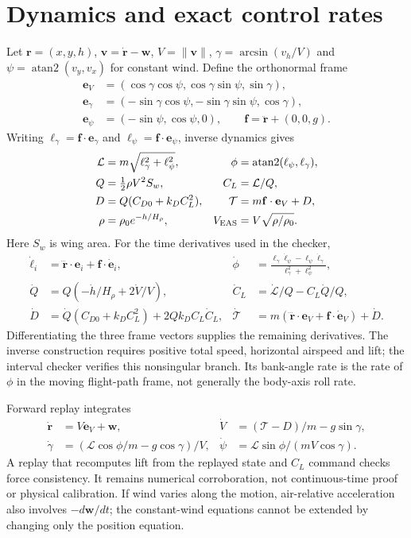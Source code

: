 \appendix
\section{Dynamics and exact control rates}\label{app:dynamics}
Let $\mathbf r=(x,y,h)$, $\mathbf v=\dot{\mathbf r}-\mathbf w$, $V=\|\mathbf v\|$, $\gamma=\arcsin(v_h/V)$ and $\psi=\operatorname{atan2}(v_y,v_x)$ for constant wind. Define the orthonormal frame
\begin{align}
\mathbf e_V&=(\cos\gamma\cos\psi,\cos\gamma\sin\psi,\sin\gamma),\\
\mathbf e_\gamma&=(-\sin\gamma\cos\psi,-\sin\gamma\sin\psi,\cos\gamma),\\
\mathbf e_\psi&=(-\sin\psi,\cos\psi,0),\qquad \mathbf f=\ddot{\mathbf r}+(0,0,g).
\end{align}
Writing $\ell_\gamma=\mathbf f\cdot\mathbf e_\gamma$ and $\ell_\psi=\mathbf f\cdot\mathbf e_\psi$, inverse dynamics gives
\begin{align}
\mathcal L&=m\sqrt{\ell_\gamma^2+\ell_\psi^2}, &\phi&=\operatorname{atan2}(\ell_\psi,\ell_\gamma),\\
Q&=\tfrac12\rho V^2S_w, & C_L&=\mathcal L/Q,\\
D&=Q(C_{D0}+k_D C_L^2), &\mathcal T&=m\mathbf f\cdot\mathbf e_V+D,\\
\rho&=\rho_0e^{-h/H_\rho}, &V_{\rm EAS}&=V\sqrt{\rho/\rho_0}.
\end{align}
Here $S_w$ is wing area. For the time derivatives used in the checker,
\begin{align}
\dot\ell_i&=\dddot{\mathbf r}\cdot\mathbf e_i+\mathbf f\cdot\dot{\mathbf e}_i,
&\dot\phi&=\frac{\ell_\gamma\dot\ell_\psi-\ell_\psi\dot\ell_\gamma}{\ell_\gamma^2+\ell_\psi^2},\\
\dot Q&=Q(-\dot h/H_\rho+2\dot V/V),
&\dot C_L&=\dot{\mathcal L}/Q-C_L\dot Q/Q,\\
\dot D&=\dot Q(C_{D0}+k_DC_L^2)+2Qk_DC_L\dot C_L,
&\dot{\mathcal T}&=m(\dddot{\mathbf r}\cdot\mathbf e_V+\mathbf f\cdot\dot{\mathbf e}_V)+\dot D.
\end{align}
Differentiating the three frame vectors supplies the remaining derivatives. The inverse construction requires positive total speed, horizontal airspeed and lift; the interval checker verifies this nonsingular branch. Its bank-angle rate is the rate of $\phi$ in the moving flight-path frame, not generally the body-axis roll rate.

Forward replay integrates
\begin{align}
\dot{\mathbf r}&=V\mathbf e_V+\mathbf w,&\dot V&=(\mathcal T-D)/m-g\sin\gamma,\\
\dot\gamma&=(\mathcal L\cos\phi/m-g\cos\gamma)/V,&
\dot\psi&=\mathcal L\sin\phi/(mV\cos\gamma).
\end{align}
A replay that recomputes lift from the replayed state and $C_L$ command checks force consistency. It remains numerical corroboration, not continuous-time proof or physical calibration. If wind varies along the motion, air-relative acceleration also involves $-d\mathbf w/dt$; the constant-wind equations cannot be extended by changing only the position equation.

